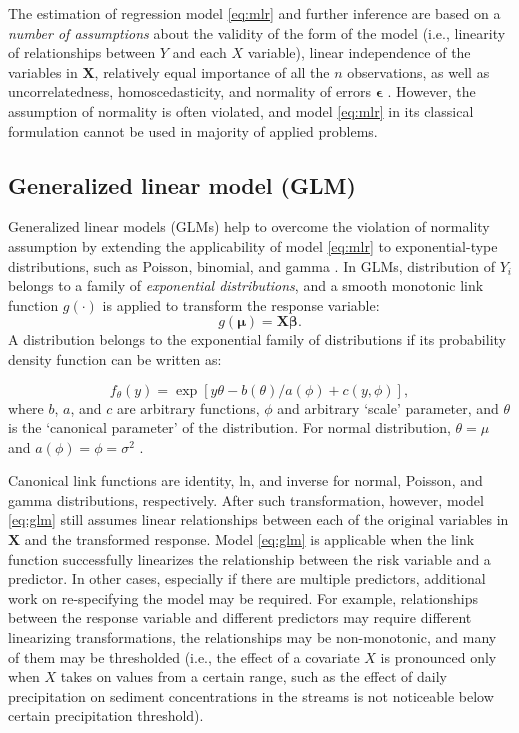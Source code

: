 \documentclass[
]{book}
\begin{document}
The estimation of regression model \eqref{eq:mlr} and further inference are based on a \emph{number of assumptions} about the validity of the form of the model (i.e., linearity of relationships between \(Y\) and each \(X\) variable), linear independence of the variables in \(\mathbf{X}\), relatively equal importance of all the \(n\) observations, as well as uncorrelatedness, homoscedasticity, and normality of errors \(\boldsymbol{\epsilon}\) \citep{Chatterjee:Hadi:2006}. However, the assumption of normality is often violated, and model \eqref{eq:mlr} in its classical formulation cannot be used in majority of applied problems.

\hypertarget{generalized-linear-model-glm}{%
\subsection{Generalized linear model (GLM)}\label{generalized-linear-model-glm}}

Generalized linear models (GLMs) help to overcome the violation of normality assumption by extending the applicability of model \eqref{eq:mlr} to exponential-type distributions, such as Poisson, binomial, and gamma \citep{Wood:2006book}. In GLMs, distribution of \(Y_i\) belongs to a family of \emph{exponential distributions}, and a smooth monotonic link function \(g(\cdot)\) is applied to transform the response variable:
\begin{equation}
    \label{eq:glm}
    g(\boldsymbol{\mu}) = \mathbf{X}\boldsymbol{\beta}.
\end{equation}
A distribution belongs to the exponential family of distributions if its probability density function can be written as:

\[f_{\theta}(y) = \exp[{y\theta - b(\theta)}/a(\phi) + c(y, \phi)],\]
where \(b\), \(a\), and \(c\) are arbitrary functions, \(\phi\) and arbitrary `scale' parameter, and \(\theta\) is the `canonical parameter' of the distribution. For normal distribution, \(\theta = \mu\) and \(a(\phi) = \phi= \sigma^2\) \citep{Wood:2006book}.

Canonical link functions are identity, ln, and inverse for normal, Poisson, and gamma distributions, respectively. After such transformation, however, model \eqref{eq:glm} still assumes linear relationships between each of the original variables in \(\mathbf{X}\) and the transformed response. Model \eqref{eq:glm} is applicable when the link function successfully linearizes the relationship between the risk variable and a predictor. In other cases, especially if there are multiple predictors, additional work on re-specifying the model may be required. For example, relationships between the response variable and different predictors may require different linearizing transformations, the relationships may be non-monotonic, and many of them may be thresholded (i.e., the effect of a covariate \(X\) is pronounced only when \(X\) takes on values from a certain range, such as the effect of daily precipitation on sediment concentrations in the streams is not noticeable below certain precipitation threshold).
\end{document}
